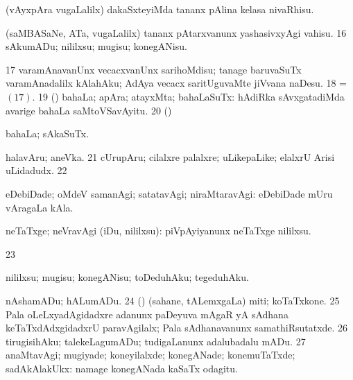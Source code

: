{ (vAyxpAra
\mo vugaLalilx) dakaSxteyiMda tananx pAlina kelasa nivaRhisu. 

 (saMBASaNe, ATa, \mo vugaLalilx) tananx pAtarxvanunx
yashasivxyAgi vahisu. 
\num{16}  sAkumADu; nililxsu; mugisu; konegANisu.
 \hypertarget{end(1) nuga(17)}{}
\num{17}  varamAnavanUnx vecacxvanUnx
sarihoMdisu; tanage 
baruvaSuTx varamAnadalilx kAlahAku; AdAya vecacx saritUguvaMte jiVvana
naDesu. 
\num{18}  = \hyperlink{end(1) nuga(17)}{\nuga $(17)$}. 
\num{19}  (\AmA) 
bahaLa; apAra; atayxMta; bahaLaSuTx:  hAdiRka sAvxgatadiMda avarige bahaLa saMtoVSavAyitu. 
\num{20}  (\AmA) 

 bahaLa; sAkaSuTx. 

 halavAru; aneVka. 
\num{21}  cUrupAru; cilalxre palalxre; uLikepaLike; elalxrU
Arisi uLidadudx. 
\num{22}  

 eDebiDade; oMdeV samanAgi; 
satatavAgi; niraMtaravAgi:  eDebiDade mUru vAragaLa
kAla. 

 neTaTxge; neVravAgi (iDu, nililxsu): 
piVpAyiyanunx neTaTxge nililxsu. 
\num{23}  

 nililxsu;
mugisu; konegANisu; toDeduhAku; tegeduhAku. 

 nAshamADu; hALumADu. 
\num{24}  (\AmA) (sahane, tALemxgaLa) miti; koTaTxkone. 
\num{25}  Pala oLeLxyadAgidadxre
adanunx paDeyuva 
mAgaR yA sAdhana keTaTxdAdxgidadxrU paravAgilalx; Pala sAdhanavanunx 
samathiRsutatxde. 
\num{26}  tirugisihAku; talekeLagumADu;
tudigaLanunx adalubadalu mADu. 
\num{27}  anaMtavAgi; mugiyade;
koneyilalxde; konegANade; konemuTaTxde; sadAkAlakUkx:  namage konegANada kaSaTx odagitu.}
\eentry

\bentry
{}
\gl{\sakirx}
{}

